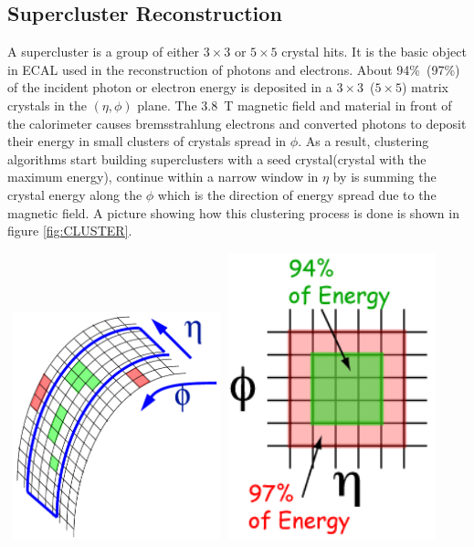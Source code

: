 \subsection{Supercluster Reconstruction}
A supercluster is a group of either $3\times3$ or $5\times5$ crystal hits. It is the basic object in ECAL used in the reconstruction of photons and electrons. About 94\%~(97\%) of the incident photon or electron energy is deposited in a $3\times3$~($5\times5$) matrix crystals in the $(\eta, \phi)$ plane. The $3.8$~T magnetic field and material in front of the calorimeter causes bremsstrahlung electrons and converted photons to deposit their energy in small clusters of crystals spread in $\phi$. As a result, clustering algorithms start building superclusters with a seed crystal(crystal with the maximum energy), continue within a narrow window in $\eta$ by is summing  the crystal energy along the $\phi$ which is the direction of energy spread due to the magnetic field. A picture showing how this clustering process is done is shown in figure \ref{fig:CLUSTER}.
\begin{center}
\centering
\mbox{
\includegraphics[height=0.35\textwidth, width=0.45\textwidth]{THESISPLOTS/ECAL_CLustering.png}\quad
\includegraphics[height=0.35\textwidth, width=0.45\textwidth]{THESISPLOTS/BasicCluster.png}}
\label{fig:CLUSTER}
\end{center}

